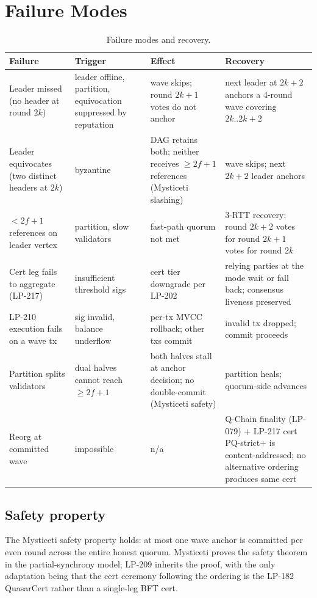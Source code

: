 \section{Failure Modes}

\begin{table}[h]
\centering
\small
\begin{tabular}{@{}p{3.5cm}p{3cm}p{4cm}p{3.5cm}@{}}
\toprule
\textbf{Failure} & \textbf{Trigger} & \textbf{Effect} & \textbf{Recovery} \\
\midrule
Leader missed (no header at round $2k$) & leader offline, partition, equivocation suppressed by reputation & wave skips; round $2k{+}1$ votes do not anchor & next leader at $2k{+}2$ anchors a 4-round wave covering $2k..2k{+}2$ \\
Leader equivocates (two distinct headers at $2k$) & byzantine & DAG retains both; neither receives $\geq 2f{+}1$ references (Mysticeti slashing) & wave skips; next $2k{+}2$ leader anchors \\
$<2f{+}1$ references on leader vertex & partition, slow validators & fast-path quorum not met & 3-RTT recovery: round $2k{+}2$ votes for round $2k{+}1$ votes for round $2k$ \\
Cert leg fails to aggregate (LP-217) & insufficient threshold sigs & cert tier downgrade per LP-202 & relying parties at the mode wait or fall back; consensus liveness preserved \\
LP-210 execution fails on a wave tx & sig invalid, balance underflow & per-tx MVCC rollback; other txs commit & invalid tx dropped; commit proceeds \\
Partition splits validators & dual halves cannot reach $\geq 2f{+}1$ & both halves stall at anchor decision; no double-commit (Mysticeti safety) & partition heals; quorum-side advances \\
Reorg at committed wave & impossible & n/a & Q-Chain finality (LP-079) + LP-217 cert PQ-strict$+$ is content-addressed; no alternative ordering produces same cert \\
\bottomrule
\end{tabular}
\caption{Failure modes and recovery.}
\label{tab:failures}
\end{table}

\subsection{Safety property}

The Mysticeti safety property holds: at most one wave anchor is
committed per even round across the entire honest quorum. Mysticeti
\cite{mysticeti2024} proves the safety theorem in the partial-synchrony
model; LP-209 inherits the proof, with the only adaptation being that
the cert ceremony following the ordering is the LP-182 QuasarCert
rather than a single-leg BFT cert.

